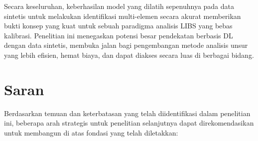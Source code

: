 Secara keseluruhan, keberhasilan model yang dilatih sepenuhnya pada data sintetis untuk melakukan identifikasi multi-elemen secara akurat memberikan bukti konsep yang kuat untuk sebuah paradigma analisis LIBS yang bebas kalibrasi. Penelitian ini menegaskan potensi besar pendekatan berbasis DL dengan data sintetis, membuka jalan bagi pengembangan metode analisis unsur yang lebih efisien, hemat biaya, dan dapat diakses secara luas di berbagai bidang.

\section{Saran}
Berdasarkan temuan dan keterbatasan yang telah diidentifikasi dalam penelitian ini, beberapa arah strategis untuk penelitian selanjutnya dapat direkomendasikan untuk membangun di atas fondasi yang telah diletakkan:
